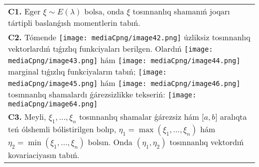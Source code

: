 \documentclass{article}
\begin{document}
\begin{tabular}{m{17cm}}
 \\
\textbf{C1.} Eger \(\xi\sim E(\lambda)\) bolsa, onda \(\xi\) tosınnanlıq shamanıń joqarı tártipli baslanǵısh momentlerin tabıń.
 \\
\textbf{C2.} Tómende \texttt{[image: mediaCpng/image42.png]} úzliksiz tosınnanlıq vektorlardıń tıǵızlıq funkciyaları berilgen. Olardıń \texttt{[image: mediaCpng/image43.png]} hám \texttt{[image: mediaCpng/image44.png]} marginal tıǵızlıq funkciyaların tabıń; \texttt{[image: mediaCpng/image45.png]} hám \texttt{[image: mediaCpng/image46.png]} tosınnanlıq shamalardı ǵárezsizlikke tekseriń: \texttt{[image: mediaCpng/image64.png]}
 \\
\textbf{C3.} Meyli, \(\xi_{1},...,\xi_{n}\) tosınnanlıq shamalar ǵárezsiz hám \(\lbrack a,b\rbrack\) aralıqta teń ólshemli bólistirilgen bolıp, \(\eta_{1} = \max\left( \xi_{1},...,\xi_{n} \right)\) hám \(\eta_{2} = \min\left( \xi_{1},...,\xi_{n} \right)\) bolsın. Onda \(\left( \eta_{1},\eta_{2} \right)\) tosınnanlıq vektordıń kovariaciyasın tabıń.
 \\

\end{tabular}
\vspace{1cm}
\end{document}
